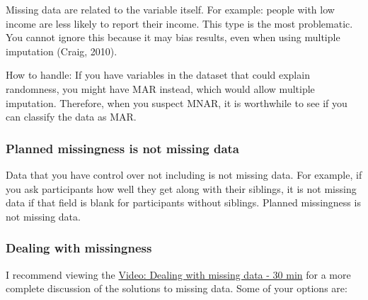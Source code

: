 \documentclass[
]{book}
\begin{document}
Missing data are related to the variable itself. For example: people with low income are less likely to report their income. This type is the most problematic. You cannot ignore this because it may bias results, even when using multiple imputation (Craig, 2010).

How to handle: If you have variables in the dataset that could explain randomness, you might have MAR instead, which would allow multiple imputation. Therefore, when you suspect MNAR, it is worthwhile to see if you can classify the data as MAR.

\hypertarget{planned-missingness-is-not-missing-data}{%
\subsubsection{Planned missingness is not missing data}\label{planned-missingness-is-not-missing-data}}

Data that you have control over not including is not missing data. For example, if you ask participants how well they get along with their siblings, it is not missing data if that field is blank for participants without siblings. Planned missingness is not missing data.

\hypertarget{dealing-with-missingness}{%
\subsubsection{Dealing with missingness}\label{dealing-with-missingness}}

I recommend viewing the \href{https://youtu.be/nDNuk2iag_o}{Video: Dealing with missing data - 30 min} for a more complete discussion of the solutions to missing data. Some of your options are:
\end{document}
